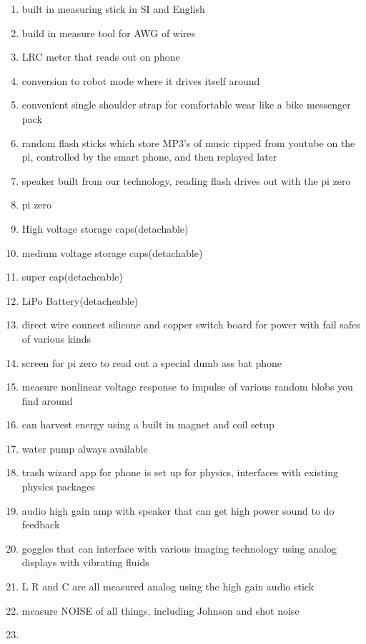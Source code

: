 \begin{enumerate}
\def\labelenumi{\arabic{enumi}.}
\item
  built in measuring stick in SI and English
\item
  build in measure tool for AWG of wires
\item
  LRC meter that reads out on phone
\item
  conversion to robot mode where it drives itself around
\item
  convenient single shoulder strap for comfortable wear like a bike
  messenger pack
\item
  random flash sticks which store MP3's of music ripped from youtube on
  the pi, controlled by the smart phone, and then replayed later
\item
  speaker built from our technology, reading flash drives out with the
  pi zero
\item
  pi zero
\item
  High voltage storage caps(detachable)
\item
  medium voltage storage caps(detachable)
\item
  super cap(detacheable)
\item
  LiPo Battery(detacheable)
\item
  direct wire connect silicone and copper switch board for power with
  fail safes of various kinds
\item
  screen for pi zero to read out a special dumb ass bat phone
\item
  measure nonlinear voltage response to impulse of various random blobs
  you find around
\item
  can harvest energy using a built in magnet and coil setup
\item
  water pump always available
\item
  trash wizard app for phone is set up for physics, interfaces with
  existing physics packages
\item
  audio high gain amp with speaker that can get high power sound to do
  feedback
\item
  goggles that can interface with various imaging technology using
  analog displays with vibrating fluids
\item
  L R and C are all measured analog using the high gain audio stick
\item
  measure NOISE of all things, including Johnson and shot noise
\item
\end{enumerate}

